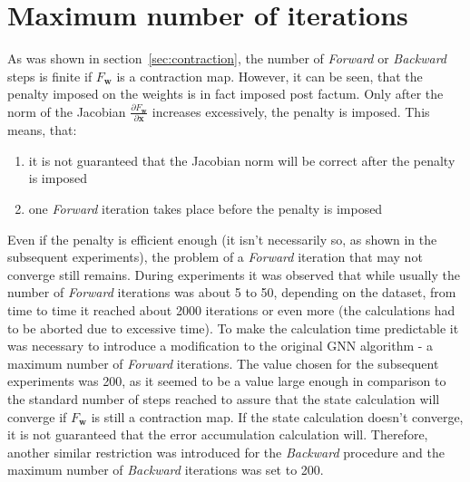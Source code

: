 \section{Maximum number of iterations}
As was shown in section~\ref{sec:contraction}, the number of \emph{Forward} or \emph{Backward} steps is finite if $F_{\bm{w}}$ is a contraction map. However, it can be seen, that the penalty imposed on the weights is in fact imposed post factum. Only after the norm of the Jacobian $\frac{\partial F_{\bm{w}}}{\partial \bm{x}}$ increases excessively, the penalty is imposed. This means, that:
\begin{enumerate}
	\item it is not guaranteed that the Jacobian norm will be correct after the penalty is imposed
	\item one \emph{Forward} iteration takes place before the penalty is imposed
\end{enumerate}
Even if the penalty is efficient enough (it isn't necessarily so, as shown in the subsequent experiments), the problem of a \emph{Forward} iteration that may not converge still remains. During experiments it was observed that while usually the number of \emph{Forward} iterations was about 5 to 50, depending on the dataset, from time to time it reached about 2000 iterations or even more (the calculations had to be aborted due to excessive time). To make the calculation time predictable it was necessary to introduce a modification to the original GNN algorithm - a maximum number of \emph{Forward} iterations. The value chosen for the subsequent experiments was 200, as it seemed to be a value large enough in comparison to the standard number of steps reached to assure that the state calculation will converge if $F_{\bm{w}}$ is still a contraction map. If the state calculation doesn't converge, it is not guaranteed that the error accumulation calculation will. Therefore, another similar restriction was introduced for the \emph{Backward} procedure and the maximum number of \emph{Backward} iterations was set to 200. 

\newpage
